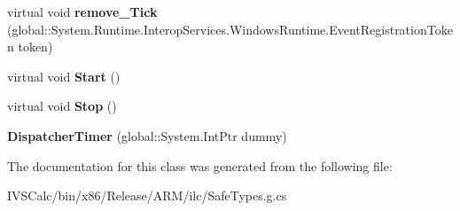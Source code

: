 \begin{DoxyCompactItemize}
\item 
\mbox{\label{class_windows_1_1_u_i_1_1_xaml_1_1_dispatcher_timer_a2dead21112a95b1c2d77308cd76f9917}} 
virtual void {\bfseries remove\+\_\+\+Tick} (global\+::\+System.\+Runtime.\+Interop\+Services.\+Windows\+Runtime.\+Event\+Registration\+Token token)
\item 
\mbox{\label{class_windows_1_1_u_i_1_1_xaml_1_1_dispatcher_timer_ace863a2c747bd7aa446b55fd38eaca7e}} 
virtual void {\bfseries Start} ()
\item 
\mbox{\label{class_windows_1_1_u_i_1_1_xaml_1_1_dispatcher_timer_a8465a583b290d1ba135b41f118bb7e91}} 
virtual void {\bfseries Stop} ()
\item 
\mbox{\label{class_windows_1_1_u_i_1_1_xaml_1_1_dispatcher_timer_a46c10638999c5f9db1a7102ce752b5e1}} 
{\bfseries Dispatcher\+Timer} (global\+::\+System.\+Int\+Ptr dummy)
\end{DoxyCompactItemize}


The documentation for this class was generated from the following file\+:\begin{DoxyCompactItemize}
\item 
I\+V\+S\+Calc/bin/x86/\+Release/\+A\+R\+M/ilc/Safe\+Types.\+g.\+cs\end{DoxyCompactItemize}
